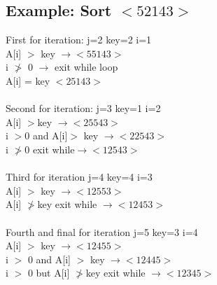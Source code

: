 \documentclass[12pt,letterpaper]{article}
\begin{document}
\subsection{Example: Sort $<52143>$}
First for iteration: j=2 key=2 i=1 \\
A[i] $>$ key $\to <55143> $ \\
i $\ngtr$ 0 $\to$ exit while loop \\
A{[}i{]} = key $<25143>$
\\ \\
Second for iteration: j=3 key=1 i=2 \\
A[i] $ > $key $\to<25543>$ \\
i $> $0 and A[i]$ >$ key $\to<22543>$\\
i $\ngtr$0 exit while$\to <12543>$
\\ \\
Third for iteration j=4 key=4 i=3 \\
A[i] $>$ key $\to<12553>$\\
A{[}i{]} $\ngtr$key exit while $\to<12453>$
\\ \\
Fourth and final for iteration j=5 key=3 i=4\\
A[i] $>$ key $\to<12455>$\\
i $>$ 0 and A[i] $>$ key $\to<12445>$\\
i $>$ 0 but A[i] $\ngtr$key exit while $\to<12345>$\\
\end{document}
